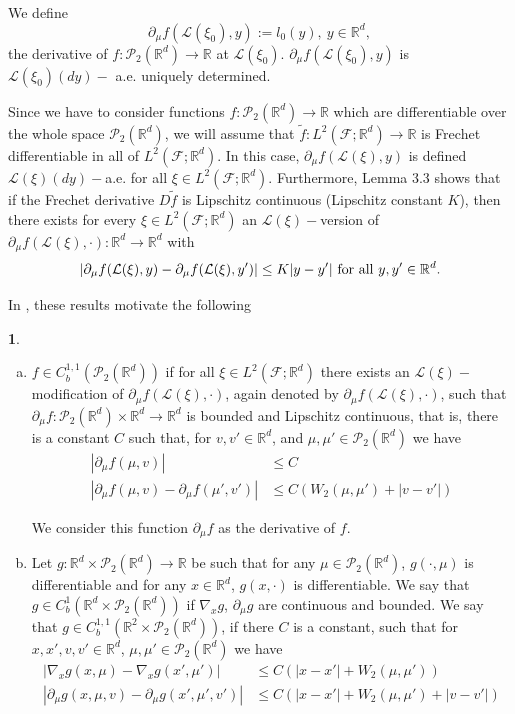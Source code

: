 \documentclass[12,english]{amsart}
\theoremstyle{plain}
\theoremstyle{definition}
\newtheorem{defn}{\protect\definitionname}
\theoremstyle{plain}
\theoremstyle{plain}
\theoremstyle{remark}
\providecommand{\definitionname}{Definition}
\newcommand{\R}{\mathbb R}
\newcommand{\cF}{\mathcal F}
\newcommand{\cL}{\mathcal L}
\newcommand{\cP}{\mathcal P}
\begin{document}
We define 
\[
\partial_\mu f(\cL(\xi_0),y):=l_0(y),~y\in\R^d,
\]
the derivative of $f:\cP_2(\R^d)\to\R$
at $\cL(\xi_0)$. $\partial_\mu f(\cL(\xi_0),y)$
is $\cL(\xi_0)(dy)-$ a.e. uniquely
determined. 

Since we have to consider functions $f:\cP_2(\R^d)\to\R$
which are differentiable over the whole space $\cP_2(\R^d)$,
we will assume that $\tilde{f}:L^2(\cF;\R^d)\to\R$
is Frechet differentiable in all of $L^2(\cF;\R^d)$.
In this case, $\partial_\mu f(\cL(\xi),y)$
is defined $\cL(\xi)(dy)-$a.e. for
all $\xi\in L^2(\cF;\R^d)$. Furthermore,
Lemma 3.3\cite{carmona2015forward} shows that if the Frechet derivative $D\tilde{f}$
is Lipschitz continuous (Lipschitz constant $K$), then there exists
for every $\xi\in L^2(\cF;\R^d)$ an
$\cL(\xi)-$version of $\partial_\mu f(\cL(\xi),\cdot):\R^d\to\R^d$
with
\[
|\partial_\mu f(\cL(\xi),y)-\partial_\mu f(\cL(\xi),y')|\leq K|y-y'|\hbox{ for all }y,y'\in\R^d.
\]

In \cite{buckdahn2017mean}, these results motivate the following
\begin{defn}\label{c11mu}\quad
  \begin{enumerate}[(a)]
  \item  $f\in C_b^{1,1}(\cP_2(\R^d))$ %
if  for all $\xi\in L^2(\cF;\R^d)$ there exists
an $\cL(\xi)-$modification of $\partial_\mu f(\cL(\xi),\cdot)$,
again denoted by $\partial_\mu f(\cL(\xi),\cdot)$,
such that $\partial_\mu f:\cP_2(\R^d)\times\R^d\to\R^d$
is bounded and Lipschitz continuous, that is, there is a constant $C$ such that, for $v,v'\in\R^d$,
and   $\mu,\mu'\in\cP_2(\R^d)$ we have
\begin{align*}
|\partial_\mu f(\mu,v)|&\leq C\\
|\partial_\mu f(\mu,v)-\partial_\mu f(\mu',v')|&\leq C(W_2(\mu,\mu')+|v-v'|)
\end{align*}

We consider this function $\partial_\mu f$
as the derivative of $f$. 
\item Let $g:\R^d\times\cP_2(\R^d)\to\R$ be such that for any
  $\mu\in\cP_2(\R^d)$, $g(\cdot,\mu)$ is differentiable and for any
  $x\in\R^d$,  $g(x,\cdot)$ is differentiable.
We say that $g\in C_b^1(\R^d\times\cP_2(\R^d))$ if $\nabla_xg$, $\partial_\mu g$
are continuous and bounded.
We say that $g\in C_b^{1,1}(\R^2\times\cP_2(\R^d))$,
if there $C$ is a constant, such that for $x,x',v,v'\in\R^d$,
  $\mu,\mu'\in\cP_2(\R^d)$ we have
  \begin{align*}
    |\nabla_xg(x,\mu)-\nabla_xg(x',\mu')|&\le C(|x-x'|+W_2(\mu,\mu'))\\
 |\partial_\mu g(x,\mu,v)-\partial_\mu g(x',\mu',v')|&\le C(|x-x'|+W_2(\mu,\mu') +|v-v'|)
  \end{align*}
 \end{enumerate}
\end{defn}
\end{document}
